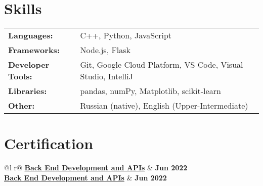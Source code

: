 \documentclass[a4paper,12pt]{article}
\begin{document}

\section{Skills}
\begin{tabularx}{\linewidth}{@{}l X@{}}
\textbf{Languages:} & \normalsize{C++, Python, JavaScript} \\
\textbf{Frameworks:} &  \normalsize{Node.js, Flask}\\
\textbf{Developer Tools:}  &  \normalsize{Git, Google Cloud Platform, VS Code, Visual Studio, IntelliJ}\\  
\textbf{Libraries:}  &  \normalsize{pandas, numPy, Matplotlib, scikit-learn}\\  
\textbf{Other:} & \normalsize{ Russian (native), English (Upper-Intermediate)} \\
\end{tabularx}

\section{Certification}

\begin{tabularx}{\linewidth}{ @{}l r@{} }
\href{https://www.freecodecamp.org/certification/dekrylov/back-end-development-and-apis}{\textbf{Back End Development and APIs}} & \hfill \textbf{Jun 2022} \\[3.75pt]
\href{https://www.freecodecamp.org/certification/dekrylov/back-end-development-and-apis}{\textbf{Back End Development and APIs}} & \hfill \textbf{Jun 2022} \\[3.75pt]
  \\
\end{tabularx}

\vfill
{}
\end{document}
